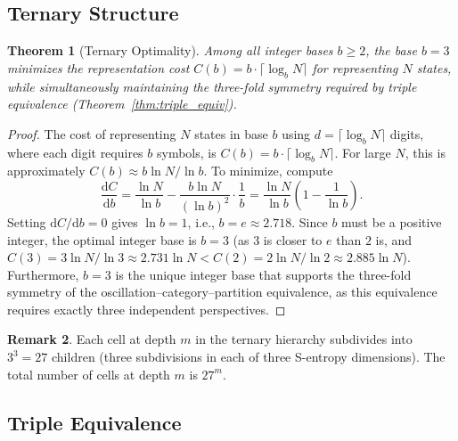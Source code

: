 \documentclass[11pt,twocolumn,a4paper]{article}
\newtheorem{theorem}{Theorem}[section]
\theoremstyle{definition}
\newtheorem{remark}[theorem]{Remark}
\newcommand{\dif}{\mathrm{d}}
\begin{document}
\subsection{Ternary Structure}\label{sec:foundations:ternary}

\begin{theorem}[Ternary Optimality]\label{thm:ternary}
Among all integer bases $b \geq 2$, the base $b = 3$ minimizes the representation cost
$C(b) = b \cdot \lceil \log_b N \rceil$ for representing $N$ states, while simultaneously
maintaining the three-fold symmetry required by triple equivalence
(Theorem~\ref{thm:triple_equiv}).
\end{theorem}

\begin{proof}
The cost of representing $N$ states in base $b$ using $d = \lceil \log_b N \rceil$ digits,
where each digit requires $b$ symbols, is $C(b) = b \cdot \lceil \log_b N \rceil$.
For large $N$, this is approximately $C(b) \approx b \ln N / \ln b$. To minimize,
compute
\begin{equation}
  \frac{\dif C}{\dif b} = \frac{\ln N}{\ln b} - \frac{b \ln N}{(\ln b)^2} \cdot \frac{1}{b}
  = \frac{\ln N}{\ln b}\left(1 - \frac{1}{\ln b}\right).
\end{equation}
Setting $\dif C / \dif b = 0$ gives $\ln b = 1$, i.e., $b = e \approx 2.718$. Since $b$
must be a positive integer, the optimal integer base is $b = 3$ (as $3$ is closer to $e$
than $2$ is, and $C(3) = 3\ln N / \ln 3 \approx 2.731 \ln N < C(2) = 2\ln N / \ln 2
\approx 2.885 \ln N$). Furthermore, $b = 3$ is the unique integer base that supports the
three-fold symmetry of the oscillation--category--partition equivalence, as this equivalence
requires exactly three independent perspectives.
\end{proof}

\begin{remark}\label{rem:ternary_subdivision}
Each cell at depth $m$ in the ternary hierarchy subdivides into $3^3 = 27$ children
(three subdivisions in each of three S-entropy dimensions). The total number of cells
at depth $m$ is $27^m$.
\end{remark}

\subsection{Triple Equivalence}\label{sec:foundations:triple}
\end{document}
